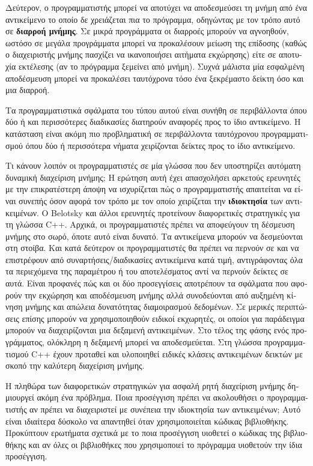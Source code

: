 \begin{greek}
Δεύτερον, ο προγραμματιστής μπορεί να αποτύχει να αποδεσμεύσει
τη μνήμη από ένα αντικείμενο το οποίο δε χρειάζεται πια το πρόγραμμα,
οδηγώντας με τον τρόπο αυτό σε \textbf{διαρροή μνήμης}. Σε μικρά
προγράμματα οι διαρροές μπορούν να αγνοηθούν, ωστόσο σε μεγάλα
προγράμματα μπορεί να προκαλέσουν μείωση της επίδοσης (καθώς
ο διαχειριστής μνήμης πασχίζει να ικανοποιήσει αιτήματα εκχώρησης)
είτε σε αποτυχία εκτέλεσης (αν το πρόγραμμα ξεμείνει από μνήμη).
Συχνά μάλιστα μία εσφαλμένη αποδέσμευση μπορεί να προκαλέσει
ταυτόχρονα τόσο ένα ξεκρέμαστο δείκτη όσο και μια διαρροή.

Τα προγραμματιστικά σφάλματα του τύπου αυτού είναι συνήθη σε
περιβάλλοντα όπου δύο ή και περισσότερες διαδικασίες διατηρούν
αναφορές προς το ίδιο αντικείμενο. Η κατάσταση είναι ακόμη πιο
προβληματική σε περιβάλλοντα ταυτόχρονου προγραμματισμού όπου
δύο ή περισσότερα νήματα χειρίζονται δείκτες προς το ίδιο αντικείμενο.

Τι κάνουν λοιπόν οι προγραμματιστές σε μία γλώσσα που δεν υποστηρίζει
αυτόματη δυναμική διαχείριση μνήμης; Η ερώτηση αυτή έχει απασχολήσει
αρκετούς ερευνητές με την επικρατέστερη άποψη να ισχυρίζεται πώς
ο προγραμματιστής απαιτείται να είναι συνεπής όσον αφορά τον τρόπο
με τον οποίο χειρίζεται την \textbf{ιδιοκτησία} των αντικειμένων.
Ο Belotsky \cite{belo03} και άλλοι ερευνητές προτείνουν διαφορετικές
στρατηγικές για τη γλώσσα C++. Αρχικά, οι προγραμματιστές πρέπει
να αποφεύγουν τη δέσμευση μνήμης στο σωρό, όποτε αυτό είναι
δυνατό. Τα αντικείμενα μπορούν να δεσμεύονται στη στοίβα. Και
κατά δεύτερον οι προγραμματιστές θα πρέπει να περνούν σε και να
επιστρέφουν από συναρτήσεις/διαδικασίες αντικείμενα κατά τιμή,
αντιγράφοντας όλα τα περιεχόμενα της παραμέτρου ή του αποτελέσματος
αντί να περνούν δείκτες σε αυτά. Είναι προφανές πώς και οι δύο
προσεγγίσεις αποτρέπουν τα σφάλματα που αφορούν την εκχώρηση και
αποδέσμευση μνήμης αλλά συνοδεύονται από αυξημένη κίνηση μνήμης
και απώλεια δυνατότητας διαμοιρασμού δεδομένων. Σε μερικές περιπτώσεις
επίσης μπορούν να χρησιμοποιηθούν ειδικοί εκχωρητές, οι οποίοι
για παράδειγμα μπορούν να διαχειρίζονται μια δεξαμενή αντικειμένων.
Στο τέλος της φάσης ενός προγράμματος, ολόκληρη η δεξαμενή μπορεί
να αποδεσμεύεται. Στη γλώσσα προγραμματισμού C++ έχουν προταθεί
και υλοποιηθεί ειδικές κλάσεις αντικειμένων δεικτών με σκοπό
την καλύτερη διαχείριση μνήμης.

Η πληθώρα των διαφορετικών στρατηγικών για ασφαλή ρητή διαχείριση
μνήμης δημιουργεί ακόμη ένα πρόβλημα. Ποια προσέγγιση πρέπει
να ακολουθήσει ο προγραμματιστής αν πρέπει να διαχειριστεί με
συνέπεια την ιδιοκτησία των αντικειμένων; Αυτό είναι ιδιαίτερα
δύσκολο να απαντηθεί όταν χρησιμοποιείται κώδικας βιβλιοθήκης.
Προκύπτουν ερωτήματα σχετικά με το ποια προσέγγιση υιοθετεί ο
κώδικας της βιβλιοθήκης και αν όλες οι βιβλιοθήκες που χρησιμοποιεί
το πρόγραμμα υιοθετούν την ίδια προσέγγιση.


\end{greek}
